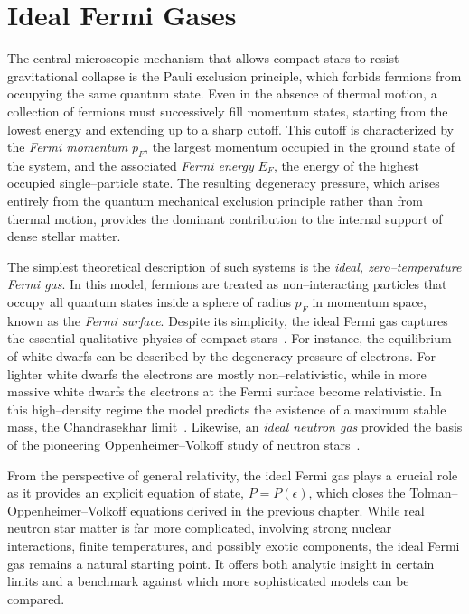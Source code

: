 \chapter{Ideal Fermi Gases}
\label{chap:fermi}

The central microscopic mechanism that allows compact stars to resist gravitational collapse
is the Pauli exclusion principle, which forbids fermions from occupying the same quantum state.
Even in the absence of thermal motion, a collection of fermions must successively fill momentum
states, starting from the lowest energy and extending up to a sharp cutoff. This cutoff is
characterized by the \emph{Fermi momentum} $p_F$, the largest momentum occupied in the ground
state of the system, and the associated \emph{Fermi energy} $E_F$, the energy of the highest
occupied single--particle state. The resulting degeneracy pressure, which arises entirely from the
quantum mechanical exclusion principle rather than from thermal motion, provides the dominant
contribution to the internal support of dense stellar matter. 

The simplest theoretical description of such systems is the \emph{ideal, zero--temperature Fermi
gas}. In this model, fermions are treated as non--interacting particles that occupy all quantum
states inside a sphere of radius $p_F$ in momentum space, known as the \emph{Fermi surface}.
Despite its simplicity, the ideal Fermi gas captures the essential qualitative physics of compact
stars~\cite{pathria2011}. For instance, the equilibrium of white dwarfs can be described by the
degeneracy pressure of electrons. For lighter white dwarfs the electrons are mostly
non--relativistic, while in more massive white dwarfs the electrons at the Fermi surface become
relativistic. In this high--density regime the model predicts the existence of a maximum stable
mass, the Chandrasekhar limit~\cite{chandrasekhar1931,chandrasekhar1935,shapiro_teukolsky}. Likewise,
an \emph{ideal neutron gas} provided the basis of the pioneering Oppenheimer--Volkoff study of
neutron stars~\cite{oppenheimer1939}.

From the perspective of general relativity, the ideal Fermi gas plays a crucial role as it provides
an explicit equation of state, $P = P(\epsilon)$, which closes the Tolman--Oppenheimer--Volkoff
equations derived in the previous chapter. While real neutron star matter is far more complicated,
involving strong nuclear interactions, finite temperatures, and possibly exotic components, the ideal Fermi gas remains a natural starting point. It offers both
analytic insight in certain limits and a benchmark against which more sophisticated models can be
compared.

